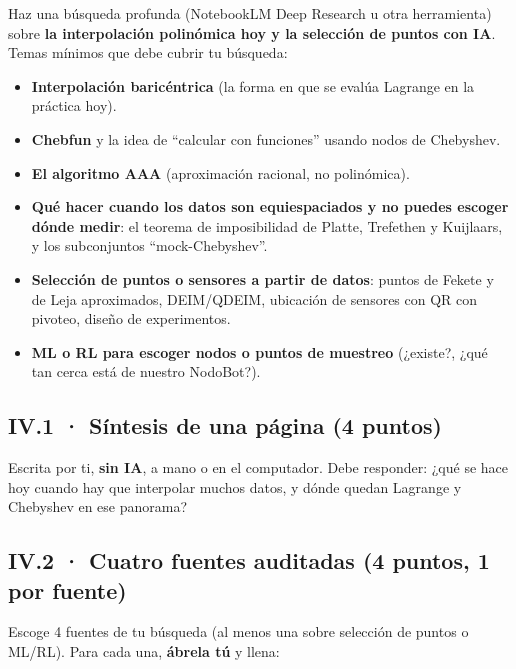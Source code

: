 Haz una búsqueda profunda (NotebookLM Deep Research u otra herramienta) sobre \textbf{la interpolación polinómica hoy y la selección de puntos con IA}. Temas mínimos que debe cubrir tu búsqueda:

\begin{itemize}
\tightlist
\item
  \textbf{Interpolación baricéntrica} (la forma en que se evalúa Lagrange en la práctica hoy).
\item
  \textbf{Chebfun} y la idea de ``calcular con funciones'' usando nodos de Chebyshev.
\item
  \textbf{El algoritmo AAA} (aproximación racional, no polinómica).
\item
  \textbf{Qué hacer cuando los datos son equiespaciados y no puedes escoger dónde medir}: el teorema de imposibilidad de Platte, Trefethen y Kuijlaars, y los subconjuntos ``mock-Chebyshev''.
\item
  \textbf{Selección de puntos o sensores a partir de datos}: puntos de Fekete y de Leja aproximados, DEIM/QDEIM, ubicación de sensores con QR con pivoteo, diseño de experimentos.
\item
  \textbf{ML o RL para escoger nodos o puntos de muestreo} (¿existe?, ¿qué tan cerca está de nuestro NodoBot?).
\end{itemize}

\subsection{IV.1 · Síntesis de una página (4 puntos)}

Escrita por ti, \textbf{sin IA}, a mano o en el computador. Debe responder: ¿qué se hace hoy cuando hay que interpolar muchos datos, y dónde quedan Lagrange y Chebyshev en ese panorama?

\subsection{IV.2 · Cuatro fuentes auditadas (4 puntos, 1 por fuente)}

Escoge 4 fuentes de tu búsqueda (al menos una sobre selección de puntos o ML/RL). Para cada una, \textbf{ábrela tú} y llena:

